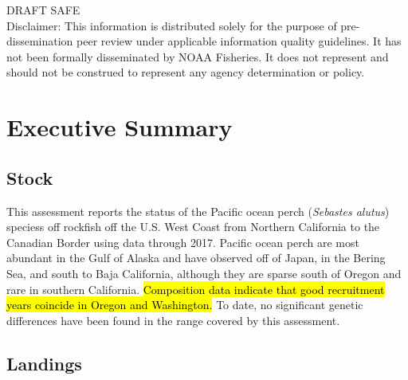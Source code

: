 \documentclass[12pt,]{article}
\begin{document}
\begin{center}
\vfill
DRAFT SAFE\\
Disclaimer: This information is distributed solely for the purpose of pre-dissemination
peer review under applicable information quality guidelines. It has not been formally
disseminated by NOAA Fisheries. It does not represent and should not be construed to
represent any agency determination or policy. 

\vspace{.3cm}

\maketitle

\setcounter{page}{1}
\end{center}

{
\setcounter{tocdepth}{4}
\tableofcontents
}
\setlength{\parskip}{5mm plus1mm minus1mm} \pagebreak

 \setcounter{page}{1}
\renewcommand{\thefigure}{\alph{figure}}
\renewcommand{\thetable}{\alph{table}}

\section*{Executive Summary}\label{executive-summary}

\subsection*{Stock}\label{stock}

This assessment reports the status of the Pacific ocean perch
(\emph{Sebastes alutus}) speciess off rockfish off the U.S. West Coast
from Northern California to the Canadian Border using data through 2017.
Pacific ocean perch are most abundant in the Gulf of Alaska and have
observed off of Japan, in the Bering Sea, and south to Baja California,
although they are sparse south of Oregon and rare in southern
California. \hl{Composition data indicate that
good recruitment years coincide in Oregon and Washington.} To date, no
significant genetic differences have been found in the range covered by
this assessment.

\subsection*{Landings}\label{landings}
\end{document}

